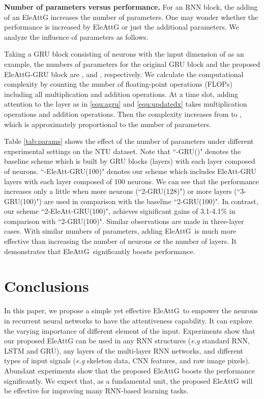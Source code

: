 \documentclass[journal]{IEEEtran}
\newcommand{\EleAttGn}{{EleAttG}}
\newcommand{\EleAttG}{{EleAttG~}}
\begin{document}
\textbf{Number of parameters versus performance.} For an RNN block, the adding of an EleAttG increases the number of parameters. One may wonder whether the performance is increased by {\EleAttGn} or just the additional parameters. We analyze the influence of parameters as follows.

Taking a GRU block consisting of  neurons with the input dimension of  as an example, the numbers of parameters for the original GRU block and the proposed EleAttG-GRU block are , and , respectively. We calculate the computational complexity by counting the number of floating-point operations (FLOPs) including all multiplication and addition operations. At a time slot, adding attention to the layer as in \ref{equ:agru} and \ref{equ:updatedx} takes  multiplication operations and  addition operations. Then the complexity increases from  to , which is approximately proportional to the number of parameters. 

Table \ref{tab:params} shows the effect of the number of parameters under different experimental settings on the NTU dataset. Note that ``-GRU()" denotes the baseline scheme which is built by  GRU blocks (layers) with each layer composed of  neurons. ``-EleAtt-GRU(100)" denotes our scheme which includes  EleAtt-GRU layers with each layer composed of 100 neurons.  We can see that the performance increases only a little when more neurons (``2-GRU(128)") or more layers (``3-GRU(100)") are used in comparison with the baseline ``2-GRU(100)". In contrast, our scheme ``2-EleAtt-GRU(100)", achieves significant gains of 3.1-4.1\% in comparison with ``2-GRU(100)". Similar observations are made in three-layer cases. With similar numbers of parameters, adding \EleAttG is much more effective than increasing the number of neurons or the number of layers. It demonstrates that \EleAttG significantly boosts performance.

\section{Conclusions}

In this paper, we propose a simple yet effective \EleAttG to empower the neurons in recurrent neural networks to have the attentiveness capability. It can explore the varying importance of different element of the input. Experiments show that our proposed EleAttG can be used in any RNN structures ({\it{e.g}} standard RNN, LSTM and GRU), any layers of the multi-layer RNN networks, and different types of input signals ({\it{e.g}} skeleton data, CNN features, and raw image pixels). Abundant experiments show that the proposed EleAttG boosts the performance significantly. We expect that, as a fundamental unit, the proposed EleAttG will be effective for improving many RNN-based learning tasks.
\end{document}
